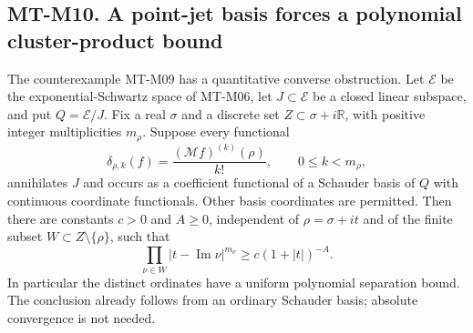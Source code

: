 \subsection*{MT-M10. A point-jet basis forces a polynomial cluster-product bound}
The counterexample MT-M09 has a quantitative converse obstruction.
Let $\mathcal E$ be the exponential-Schwartz space of MT-M06,
let $J\subset\mathcal E$ be a closed linear subspace, and put
$Q=\mathcal E/J$. Fix a real $\sigma$ and a discrete set
$Z\subset\sigma+i\mathbb R$, with positive integer multiplicities
$m_\rho$. Suppose every functional
\[
 \delta_{\rho,k}(f)=\frac{(\mathcal Mf)^{(k)}(\rho)}{k!},
 \qquad 0\le k<m_\rho,
\]
annihilates $J$ and occurs as a coefficient functional of a
Schauder basis of $Q$ with continuous coordinate functionals.
Other basis coordinates are permitted.
Then there are constants $c>0$ and $A\ge0$, independent of
$\rho=\sigma+it$ and of the finite subset
$W\subset Z\setminus\{\rho\}$, such that
\[
       \prod_{\nu\in W}|t-\operatorname{Im}\nu|^{m_\nu}
                    \ge c(1+|t|)^{-A}.                \tag{MT-M10}
\]
In particular the distinct ordinates have a uniform polynomial
separation bound. The conclusion already follows from an ordinary
Schauder basis; absolute convergence is not needed.


